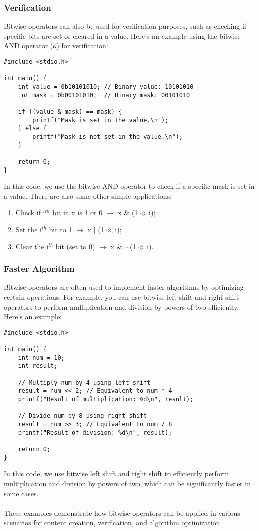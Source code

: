\documentclass{article}
\begin{document}
\subsubsection{Verification}

Bitwise operators can also be used for verification purposes, such as checking if specific bits are set or cleared in a value. Here's an example using the bitwise AND operator (\texttt{\&}) for verification:

\begin{verbatim}
#include <stdio.h>

int main() {
    int value = 0b10101010; // Binary value: 10101010
    int mask = 0b00101010;  // Binary mask: 00101010

    if ((value & mask) == mask) {
        printf("Mask is set in the value.\n");
    } else {
        printf("Mask is not set in the value.\n");
    }

    return 0;
}
\end{verbatim}
In this code, we use the bitwise AND operator to check if a specific mask is set in a value. There are also some other simple applications:
\begin{enumerate}
    \item Check if i$^{th}$ bit in x is 1 or 0 $\rightarrow$ x $\&$ (1$\ll$i);
    \item Set the i$^{th}$ bit to 1 $\rightarrow$ x $\mid$ (1$\ll$i);
    \item Clear the i$^{th}$ bit (set to 0) $\rightarrow$ x $\&$ $\sim$(1$\ll$i).
\end{enumerate}

\subsubsection{Faster Algorithm}

Bitwise operators are often used to implement faster algorithms by optimizing certain operations. For example, you can use bitwise left shift and right shift operators to perform multiplication and division by powers of two efficiently. Here's an example:

\begin{verbatim}
#include <stdio.h>

int main() {
    int num = 10;
    int result;

    // Multiply num by 4 using left shift
    result = num << 2; // Equivalent to num * 4
    printf("Result of multiplication: %d\n", result);

    // Divide num by 8 using right shift
    result = num >> 3; // Equivalent to num / 8
    printf("Result of division: %d\n", result);

    return 0;
}
\end{verbatim}
In this code, we use bitwise left shift and right shift to efficiently perform multiplication and division by powers of two, which can be significantly faster in some cases.\\
  \\
These examples demonstrate how bitwise operators can be applied in various scenarios for content creation, verification, and algorithm optimization.
\end{document}
